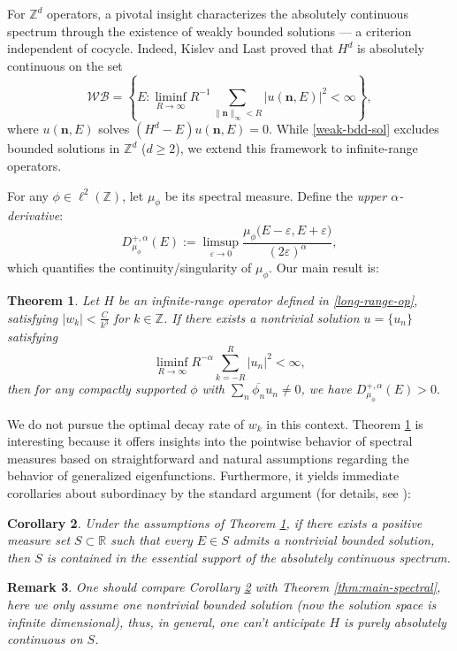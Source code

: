 \documentclass[11pt]{amsart}
\newtheorem{theorem}{Theorem}[section]
\newtheorem{coro}[theorem]{Corollary}
\newtheorem{rem}[theorem]{Remark}
\theoremstyle{remark}
\theoremstyle{definition}
\newcommand{\Z}{{\mathbf Z}}
\def \Z{\mathcal{Z}}
\def\Z{{\mathbb Z}}
\begin{document}
For $\mathbb{Z}^d$ operators, a pivotal insight characterizes the absolutely continuous spectrum through the existence of weakly bounded solutions — a criterion independent of cocycle. Indeed, Kislev and Last \cite{KL1} proved that $H^d$ is 
absolutely continuous on the set 
\begin{equation}\label{weak-bdd-sol}
    \mathcal{WB} = \left\{ E : \liminf_{R \to \infty} R^{-1} \sum_{\|\mathbf{n}\|_\infty < R} |u(\mathbf{n},E)|^2 < \infty \right\},
\end{equation}
where $u(\mathbf{n},E)$ solves $(H^d - E)u(\mathbf{n},E) = 0$. While \eqref{weak-bdd-sol} excludes bounded solutions in $\Z^d$ ($d\geq 2$), we extend this framework to infinite-range operators.

For any $\phi \in \ell^2(\mathbb{Z})$, let $\mu_\phi$ be its spectral measure. Define the \emph{upper $\alpha$-derivative}:
\[
D_{\mu_\phi}^{+,\alpha}(E) := \limsup_{\varepsilon \to 0} \frac{\mu_\phi\big(E-\varepsilon,E+\varepsilon\big)}{(2\varepsilon)^\alpha},
\]
which quantifies the continuity/singularity of $\mu_\phi$. Our main result is:
\begin{theorem}\label{sub}
Let $H$ be an infinite-range operator defined in \eqref{long-range-op}, satisfying $|w_k| < \frac{C}{k^3}$ for $k \in \mathbb{Z}$. 
If there exists a nontrivial solution $u = \{u_n\}$ satisfying
\[
\liminf_{R \to \infty} R^{-\alpha} \sum_{k=-R}^R |u_n|^2 < \infty,
\]
then for any compactly supported $\phi$ with $\sum_n \overline{\phi_n} u_n \neq 0$, we have $
D_{\mu_\phi}^{+,\alpha}(E) > 0.$
\end{theorem}

We do not pursue the optimal decay rate of $w_k$ in this context. Theorem \ref{sub} is interesting because it offers insights into the pointwise behavior of spectral measures based on straightforward and natural assumptions regarding the behavior of generalized eigenfunctions. Furthermore, it yields immediate corollaries about subordinacy by the standard argument (for details, see \cite{KL1}):

\begin{coro}\label{cor:subordinacy}
Under the assumptions of Theorem \ref{sub}, if there exists a positive measure set $S \subset \mathbb{R}$ such that every $E \in S$ admits a nontrivial bounded solution, then $S$ is contained in the essential support of the absolutely continuous spectrum.
\end{coro}


\begin{rem}
One should compare Corollary \ref{cor:subordinacy} with Theorem \ref{thm:main-spectral}, here we only assume one nontrivial bounded solution (now the solution space is infinite dimensional), thus, in general, one can't anticipate $H$ is purely absolutely continuous on $S$.
\end{rem}
\end{document}
